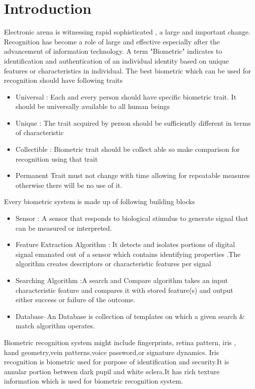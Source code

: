 \documentclass[conference]{Iris_detect}
\begin{document}
\section{Introduction}
Electronic arena is witnessing rapid sophisticated , a large and important change. Recognition has become a role of large and effective especially after the advancement of information technology.
A term "Biometric" indicates to identification and authentication of an individual identity based on unique features or characteristics in individual.\cite{Biometric}
The best biometric which can be used for recognition should have following traits
\begin{itemize}
    \item Universal : Each and every person should have specific biometric trait. It should be universally available to all human beings
    \item Unique : The trait acquired by person should be sufficiently different in terms of characteristic
    \item Collectible : Biometric trait should be collect able so make comparison for recognition using that trait
    \item Permanent Trait must not change with time allowing for repeatable measures otherwise there will be no use of it.
\end{itemize}
Every biometric system is made up of following building blocks
\begin{itemize}
    \item Sensor : A sensor that responds to biological stimulus  to generate signal that can be measured or interpreted.
    \item Feature Extraction Algorithm : It  detects and isolates portions of digital signal emanated out of a sensor which contains identifying properties .The algorithm creates descriptors or characteristic features per signal
    \item Searching Algorithm :A search and Compare algorithm takes an input characteristic feature and compares it with stored feature(s) and output  either success or failure of the outcome.
    \item  Database–An Database is collection of templates on which a given search & match algorithm operates. 
\end{itemize}
Biometric recognition system  might include fingerprints, retina pattern, iris , hand geometry,vein patterns,voice password,or signature dynamics.
Iris recognition is biometric used for purpose of identification and security.It is annular portion between dark pupil and white sclera.It has rich texture information which is used for biometric recognition system.
\end{document}
